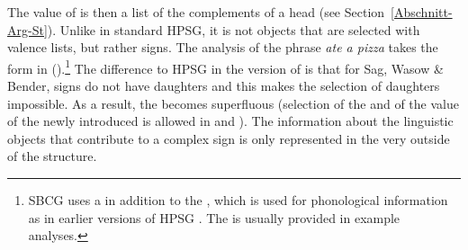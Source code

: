\noindent
The value of \comps{} is then a list of the complements of a head (see Section~\ref{Abschnitt-Arg-St}).
Unlike in standard HPSG\indexhpsg, it is not  objects that are selected with valence lists, but rather signs.
The analysis of the phrase \emph{ate a pizza} takes the form in ().\footnote{%
  SBCG uses a \formf in addition to the \phonf, which is used for phonological information as in
  earlier versions of HPSG \citep[Section~3.1, Section~3.6]{Sag2012a}. The \formf is usually provided in example analyses.
}
\ea
\label{feat-geom-swb}
\z
The difference to HPSG in the version of \citet{ps2} is that for Sag, Wasow \& Bender, signs do not have
daughters and this makes the selection of daughters impossible.
As a result, the \synsemf{} becomes superfluous (selection of the \phonv and of the
value of the newly introduced \formf is allowed in  and ).
The information about the linguistic objects that contribute to a complex sign is only represented in the very outside of the structure.

